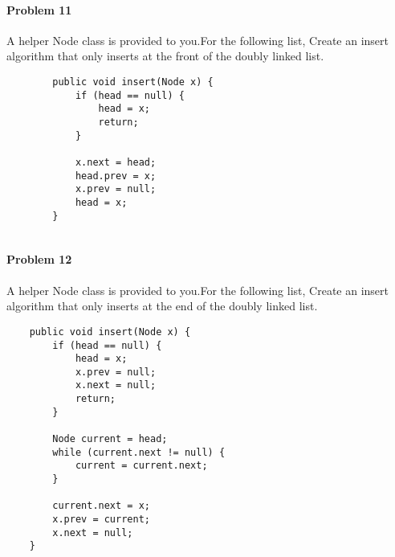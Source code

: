 \documentclass[letterpaper]{article}
\begin{document}
	\paragraph{Problem 11} A helper Node class is provided to you.For the following list, Create an insert algorithm that only inserts at the front of the doubly linked list.
	\begin{verbatim}
        public void insert(Node x) {
            if (head == null) {
                head = x;
                return;
            }
            
            x.next = head;   
            head.prev = x;   
            x.prev = null; 
            head = x;        
        }
		
	\end{verbatim}
	
	\paragraph{Problem 12} A helper Node class is provided to you.For the following list, Create an insert algorithm that only inserts at the end of the doubly linked list.
	
	\begin{verbatim}
    public void insert(Node x) {
        if (head == null) {
            head = x;
            x.prev = null;
            x.next = null;
            return;
        }
        
        Node current = head;
        while (current.next != null) {
            current = current.next;
        }
        
        current.next = x;
        x.prev = current;
        x.next = null;
    }
	\end{verbatim}
\end{document}
